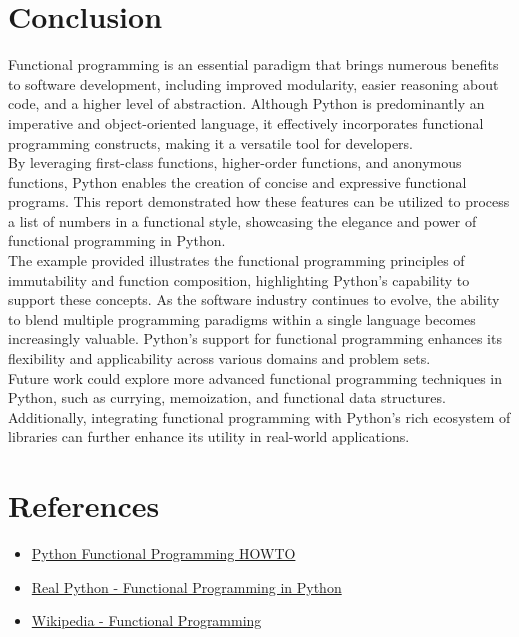 \documentclass[a4paper]{article}
\begin{document}
\newpage
\section{Conclusion}
Functional programming is an essential paradigm that brings numerous benefits to software development, including improved modularity, easier reasoning about code, and a higher level of abstraction. Although Python is predominantly an imperative and object-oriented language, it effectively incorporates functional programming constructs, making it a versatile tool for developers.\\

By leveraging first-class functions, higher-order functions, and anonymous functions, Python enables the creation of concise and expressive functional programs. This report demonstrated how these features can be utilized to process a list of numbers in a functional style, showcasing the elegance and power of functional programming in Python.\\

The example provided illustrates the functional programming principles of immutability and function composition, highlighting Python's capability to support these concepts. As the software industry continues to evolve, the ability to blend multiple programming paradigms within a single language becomes increasingly valuable. Python's support for functional programming enhances its flexibility and applicability across various domains and problem sets.\\

Future work could explore more advanced functional programming techniques in Python, such as currying, memoization, and functional data structures. Additionally, integrating functional programming with Python's rich ecosystem of libraries can further enhance its utility in real-world applications.\\


\newpage
\section{References}
\begin{itemize}
    \item \href{https://docs.python.org/3/howto/functional.html}{Python Functional Programming HOWTO}
    \item \href{https://realpython.com/python-functional-programming/}{Real Python - Functional Programming in Python}
    \item \href{https://en.wikipedia.org/wiki/Functional\_programming}{Wikipedia - Functional Programming}
\end{itemize}
\end{document}
